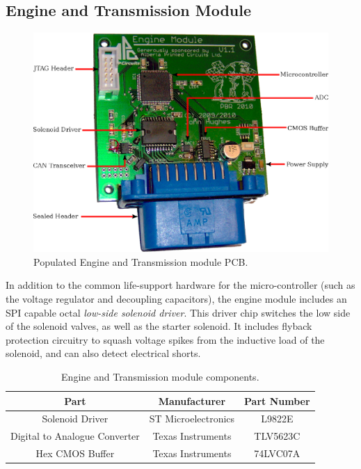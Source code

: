 \subsection{Engine and Transmission Module}

\begin{figure}[h]
\centering
\includegraphics[scale=1]{implementation/figures/engine_transmission_pcb}
\caption{Populated Engine and Transmission module PCB.}
\label{fig:engine_transmission_pcb}
\end{figure}

In addition to the common life-support hardware for the micro-controller (such as the voltage regulator and decoupling capacitors), the engine module includes an SPI capable octal \emph{low-side solenoid driver}. This driver chip switches the low side of the solenoid valves, as well as the starter solenoid. It includes flyback protection circuitry to squash voltage spikes from the inductive load of the solenoid, and can also detect electrical shorts. 

\begin{table}
  \caption{Engine and Transmission module components.\label{table:engine_transmission_module_components}}
  \centering
  \begin{tabular}{|c|c|c|}
    \hline 
    Part & Manufacturer & Part Number\tabularnewline 
    \hline \hline
    Solenoid Driver & ST Microelectronics & L9822E \tabularnewline
    \hline
    Digital to Analogue Converter & Texas Instruments & TLV5623C \tabularnewline
    \hline
    Hex CMOS Buffer & Texas Instruments & 74LVC07A \tabularnewline
    \hline
  \end{tabular}
\end{table}


